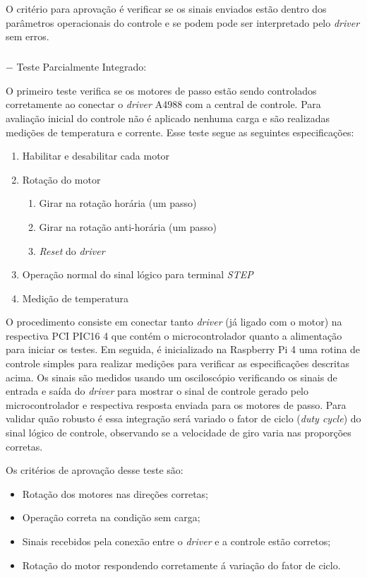 O critério para aprovação é verificar se os sinais enviados estão dentro dos parâmetros operacionais do controle e se podem pode ser interpretado pelo \textit{driver} sem erros.

\subparagraph*{} $-$ Teste Parcialmente Integrado:\label{sec:teste_parc_int}

O primeiro teste verifica se os motores de passo estão sendo controlados corretamente ao conectar o \textit{driver} A4988 com a central de controle. Para avaliação inicial do controle não é aplicado nenhuma carga e são realizadas medições de temperatura e corrente. Esse teste segue as seguintes especificações:

\begin{enumerate}
    \item Habilitar e desabilitar cada motor
    \item Rotação do motor
    \begin{enumerate}
        \item Girar na rotação horária (um passo)
        \item Girar na rotação anti-horária (um passo)
        \item \textit{Reset} do \textit{driver}
    \end{enumerate}
    \item Operação normal do sinal lógico para terminal \textit{STEP}
    \item Medição de temperatura
\end{enumerate}

O procedimento consiste em conectar tanto \textit{driver} (já ligado com o motor) na respectiva PCI PIC16 4 que contém o microcontrolador quanto a alimentação para iniciar os testes. Em seguida, é inicializado na Raspberry Pi 4 uma rotina de controle simples para realizar medições para verificar as especificações descritas acima. Os sinais são medidos usando um osciloscópio verificando os sinais de entrada e saída do \textit{driver} para mostrar o sinal de controle gerado pelo microcontrolador e respectiva resposta enviada para os motores de passo.  Para validar quão robusto é essa integração será variado o fator de ciclo (\textit{duty cycle}) do sinal lógico de controle, observando se a velocidade de giro varia nas proporções corretas. 

Os critérios de aprovação desse teste são:
\begin{itemize}
    \item Rotação dos motores nas direções corretas;
    \item Operação correta na condição sem carga;
    \item Sinais recebidos pela conexão entre o \textit{driver} e a controle estão corretos;
    \item Rotação do motor respondendo corretamente á variação do fator de ciclo. 
\end{itemize}

